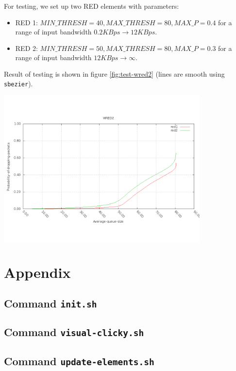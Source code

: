 \documentclass[a4paper]{article}
\begin{document}
  For testing, we set up two RED elements with parameters:
  \begin{itemize}
  	\item RED 1: $MIN\_THRESH = 40, MAX\_THRESH = 80, MAX\_P = 0.4$ for a range of input bandwidth $0.2KBps \to 12KBps$.
  	\item RED 2: $MIN\_THRESH = 50, MAX\_THRESH = 80, MAX\_P = 0.3$ for a range of input bandwidth $12KBps \to \infty$.
  \end{itemize}
  Result of testing is shown in figure \ref{fig:test-wred2} (lines are smooth using \texttt{sbezier}).
  \begin{center}
	\includegraphics[width=0.80\textwidth]{wred2.png}
	\label{fig:test-wred2}
  \end{center}
  \newpage
  \appendix
  \section{Appendix}

  \subsection{Command \texttt{init.sh}}
  

  \subsection{Command \texttt{visual-clicky.sh}}
  

  \subsection{Command \texttt{update-elements.sh}}
  
  
\end{document}
